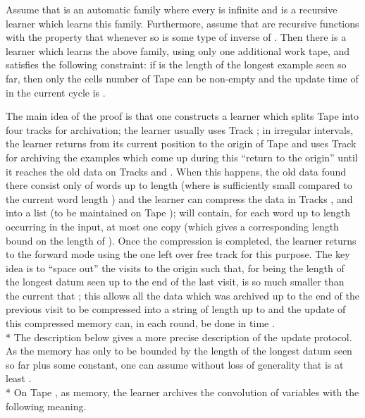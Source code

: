 \documentclass{LMCS}
\theoremstyle{plain}\newtheorem{athm}[thm]{Theorem}
\theoremstyle{plain}\newtheorem{aprop}[thm]{Proposition}
\theoremstyle{plain}\newtheorem{aprob}[thm]{Open Problem}
\theoremstyle{plain}\newtheorem{acor}[thm]{Corollary}
\theoremstyle{plain}\newtheorem{alem}[thm]{Lemma}
\theoremstyle{definition}\newtheorem{adefn}[thm]{Definition}
\theoremstyle{definition}\newtheorem{arem}[thm]{Remark}
\theoremstyle{plain}\newtheorem{aexmp}[thm]{Example}
\theoremstyle{plain}\newtheorem{aclm}[thm]{Claim}
\def\sp{\\*\indent}
\begin{document}
\begin{thm} \label{th:onetapesuperlinear}
Assume that  is an automatic family where every 
is infinite and  is a recursive learner which learns this family.
Furthermore, assume that  are recursive functions with the property
that  whenever  so  is some type of inverse
of . Then there is a learner  which learns the above family,
using only one additional work tape,
and satisfies the following constraint: 
if  is the length of the longest example seen so
far, then only the cells number  of Tape  can be non-empty and
the update time of  in the current cycle is .
\end{thm}

\proof
The main idea of the proof is that one constructs a learner which splits
Tape  into four 
tracks for archivation; the learner 
usually uses Track ; in irregular intervals, the learner returns from
its current position to the origin of Tape  and uses Track 
for archiving the examples which come up during this ``return to
the origin'' until it reaches the old data on Tracks  and .
When this happens, the old data found there consist only of words
up to length  (where  is sufficiently small compared to the
current word length ) and the learner can compress the data in
Tracks ,  and  into a list  (to be maintained on
Tape );  will contain, for each word  up to length  occurring
in the input, at most one copy (which gives a corresponding length bound
on the length of ). Once the compression is completed, the
learner returns to the forward mode using the one left over free
track for this purpose. The key idea is to ``space out'' the visits
to the origin such that, for  being the length of the longest datum
seen up to the end of the last visit,  is so much smaller
than the current  that ; this allows
all the data which was archived up to the end
of the previous visit to be compressed into a string of length
up to  and the update of this compressed memory can, in each
round, be done in time .
\sp
The description below gives a more precise description of the
update protocol. As the memory has only to be bounded by the length
of the longest datum seen so far plus some constant, one can assume
without loss of generality that  is at least .
\sp
On Tape , as memory, the learner  archives the convolution of variables
 with the following meaning.
\end{document}
